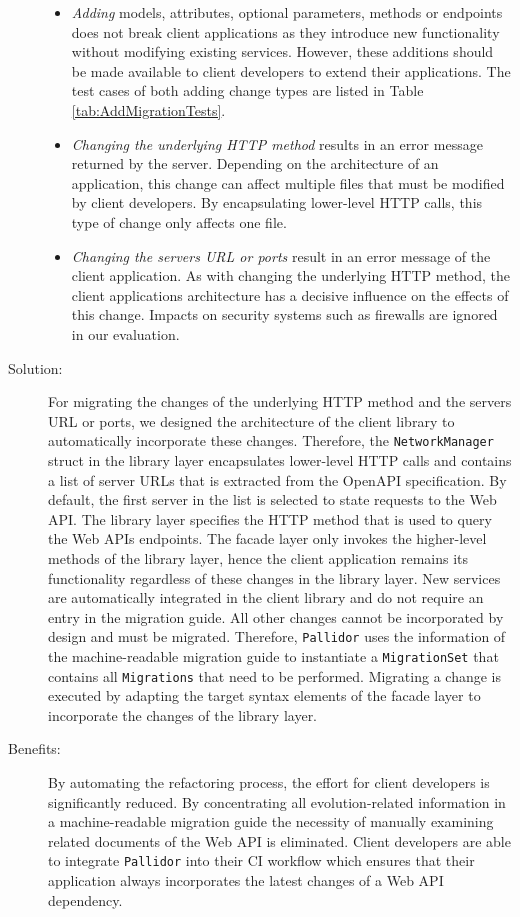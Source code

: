 \begin{description}
\begin{itemize}
		\item \textit{Adding} models, attributes, optional parameters, methods or endpoints does not break client applications as they introduce new functionality without modifying existing services. However, these additions should be made available to client developers to extend their applications. The test cases of both adding change types are listed in Table \ref{tab:AddMigrationTests}.
		\item \textit{Changing the underlying HTTP method} results in an error message returned by the server. Depending on the architecture of an application, this change can affect multiple files that must be modified by client developers. By encapsulating lower-level HTTP calls, this type of change only affects one file. 
		\item \textit{Changing the servers URL or ports} result in an error message of the client application. As with changing the underlying HTTP method, the client applications architecture has a decisive influence on the effects of this change. Impacts on security systems such as firewalls are ignored in our evaluation.
	\end{itemize}
\newpage
\item[Solution:] For migrating the changes of the underlying HTTP method and the servers URL or ports, we designed the architecture of the client library to automatically incorporate these changes. Therefore, the \texttt{NetworkManager} struct in the library layer encapsulates lower-level HTTP calls and contains a list of server URLs that is extracted from the OpenAPI specification. By default, the first server in the list is selected to state requests to the Web API. The library layer specifies the HTTP method that is used to query the Web APIs endpoints. The facade layer only invokes the higher-level methods of the library layer, hence the client application remains its functionality regardless of these changes in the library layer. New services are automatically integrated in the client library and do not require an entry in the migration guide.   All other changes cannot be incorporated by design and must be migrated. Therefore, \texttt{Pallidor} uses the information of the machine-readable migration guide to instantiate a \texttt{MigrationSet} that contains all \texttt{Migrations} that need to be performed. Migrating a change is executed by adapting the target syntax elements of the facade layer to incorporate the changes of the library layer.
\item[Benefits:] By automating the refactoring process, the effort for client developers is significantly reduced. By concentrating all evolution-related information in a machine-readable migration guide the necessity of manually examining related documents of the Web API is eliminated. Client developers are able to integrate \texttt{Pallidor} into their CI workflow which ensures that their application always incorporates the latest changes of a Web API dependency. 

\end{description}
